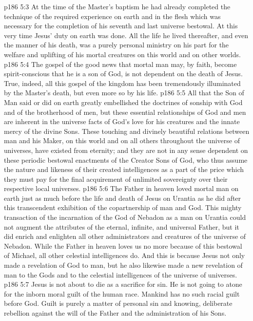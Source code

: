 \vs p186 5:3 At the time of the Master’s baptism he had already completed the technique of the required experience on earth and in the flesh which was necessary for the completion of his seventh and last universe bestowal. At this very time Jesus’ duty on earth was done. All the life he lived thereafter, and even the manner of his death, was a purely personal ministry on his part for the welfare and uplifting of his mortal creatures on this world and on other worlds.
\vs p186 5:4 The gospel of the good news that mortal man may, by faith, become spirit\hyp{}conscious that he is a son of God, is not dependent on the death of Jesus. True, indeed, all this gospel of the kingdom has been tremendously illuminated by the Master’s death, but even more so by his life.
\vs p186 5:5 All that the Son of Man said or did on earth greatly embellished the doctrines of sonship with God and of the brotherhood of men, but these essential relationships of God and men are inherent in the universe facts of God’s love for his creatures and the innate mercy of the divine Sons. These touching and divinely beautiful relations between man and his Maker, on this world and on all others throughout the universe of universes, have existed from eternity; and they are not in any sense dependent on these periodic bestowal enactments of the Creator Sons of God, who thus assume the nature and likeness of their created intelligences as a part of the price which they must pay for the final acquirement of unlimited sovereignty over their respective local universes.\plusone
\vs p186 5:6 The Father in heaven loved mortal man on earth just as much before the life and death of Jesus on Urantia as he did after this transcendent exhibition of the copartnership of man and God. This mighty transaction of the incarnation of the God of Nebadon as a man on Urantia could not augment the attributes of the eternal, infinite, and universal Father, but it did enrich and enlighten all other administrators and creatures of the universe of Nebadon. While the Father in heaven loves us no more because of this bestowal of Michael, all other celestial intelligences do. And this is because Jesus not only made a revelation of God to man, but he also likewise made a new revelation of man to the Gods and to the celestial intelligences of the universe of universes.
\vs p186 5:7 Jesus is not about to die as a sacrifice for sin. He is not going to atone for the inborn moral guilt of the human race. Mankind has no such racial guilt before God. Guilt is purely a matter of personal sin and knowing, deliberate rebellion against the will of the Father and the administration of his Sons.
